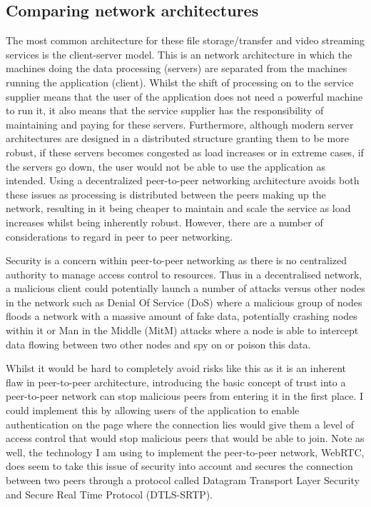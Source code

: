 \documentclass[]{report}
\begin{document}
		\subsection*{Comparing network architectures}
			The most common architecture for these file storage/transfer and video streaming services is the client-server model. This is an network architecture in which the machines doing the data processing (servers) are separated from the machines running the application (client). Whilst the shift of processing on to the service supplier means that the user of the application does not need a powerful machine to run it, it also means that the service supplier has the responsibility of maintaining and paying for these servers. Furthermore, although modern server architectures are designed in a distributed structure granting them to be more robust, if these servers becomes congested as load increases or in extreme cases, if the servers go down, the user would not be able to use the application as intended. Using a decentralized peer-to-peer networking architecture avoids both these issues as processing is distributed between the peers making up the network, resulting in it being cheaper to maintain and scale the service as load increases whilst being inherently robust. However, there are a number of considerations to regard in peer to peer networking.
		
			Security is a concern within peer-to-peer networking as there is no centralized authority to manage access control to resources. Thus in a decentralised network, a malicious client could potentially launch a number of attacks versus other nodes in the network such as Denial Of Service (DoS) where a malicious group of nodes floods a network with a massive amount of fake data, potentially crashing nodes within it or Man in the Middle (MitM) attacks where a node is able to intercept data flowing between two other nodes and spy on or poison this data.\cite{P2P Security Issues}
			
			Whilst it would be hard to completely avoid risks like this as it is an inherent flaw in peer-to-peer architecture, introducing the basic concept of trust into a peer-to-peer network can stop malicious peers from entering it in the first place. I could implement this by allowing users of the application to enable authentication on the page where the connection lies would give them a level of access control that would stop malicious peers that would be able to join. Note as well, the technology I am using to implement the peer-to-peer network, WebRTC, does seem to take this issue of security into account and secures the connection between two peers through a protocol called Datagram Transport Layer Security and Secure Real Time Protocol (DTLS-SRTP)\cite{WebRTC Security Study}.
	
\end{document}
